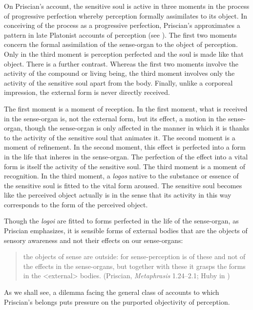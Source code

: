 \documentclass[12pt]{article}
\begin{document}
On Priscian's account, the sensitive soul is active in three moments in the process of progressive perfection whereby perception formally assimilates to its object. In conceiving of the process as a progressive perfection, Priscian's approximates a pattern in late Platonist accounts of perception (see \citealt[142]{Lloyd:1990dp}). The first two moments concern the formal assimilation of the sense-organ to the object of perception. Only in the third moment is perception perfected and the soul is made like that object. There is a further contrast. Whereas the first two moments involve the activity of the compound or living being, the third moment involves only the activity of the sensitive soul apart from the body. Finally, unlike a corporeal impression, the external form is never directly received. 


The first moment is a moment of reception. In the first moment, what is received in the sense-organ is, not the external form, but its effect, a motion in the sense-organ, though the sense-organ is only affected in the manner in which it is thanks to the activity of the sensitive soul that animates it. The second moment is a moment of refinement. In the second moment, this effect is perfected into a form in the life that inheres in the sense-organ. The perfection of the effect into a vital form is itself the activity of the sensitive soul. The third moment is a moment of recognition. In the third moment, a \emph{logos} native to the substance or essence of the sensitive soul is fitted to the vital form aroused. The sensitive soul becomes like the perceived object actually is in the sense that its activity in this way corresponds to the form of the perceived object. 

Though the \emph{logoi} are fitted to forms perfected in the life of the sense-organ, as Priscian emphasizes, it is sensible forms of external bodies that are the objects of sensory awareness and not their effects on our sense-organs:
\begin{quote}
	the objects of sense are outside: for sense-perception is of these and not of the effects in the sense-organs, but together with these it grasps the forms in the <external> bodies. (Priscian, \emph{Metaphrasis} 1.24--2.1; Huby in \citealt[9]{Sorabji:1997ly})
\end{quote}
As we shall see, a dilemma facing the general class of accounts to which Priscian's belongs puts pressure on the purported objectivity of perception.
\end{document}
